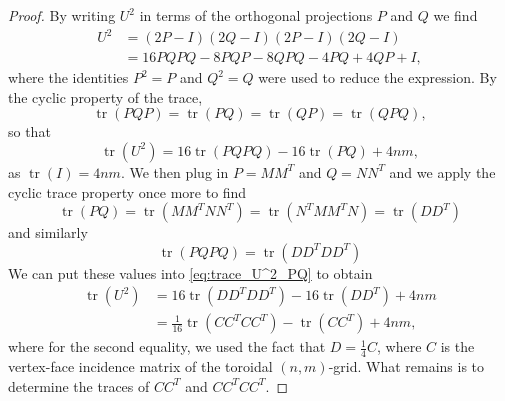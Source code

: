 \documentclass{article}
\numberwithin{equation}{section}
\DeclareMathOperator\tr{tr}
\begin{document}
\begin{proof}


By writing $U^2$ in terms of the orthogonal projections $P$ and $Q$ we find
\[
\begin{split}
U^2 &= (2P - I)(2Q - I)(2P - I)(2Q - I) \\
&= 16PQPQ - 8PQP - 8QPQ - 4PQ + 4QP + I,
\end{split}
\]
where the identities $P^2 = P$ and $Q^2 = Q$ were used to reduce the expression. By the cyclic property of the trace,
\[
\tr(PQP) = \tr(PQ) = \tr(QP) = \tr(QPQ),
\]
so that
\begin{equation}
\label{eq:trace_U^2_PQ}
\tr(U^2) = 16\tr(PQPQ) - 16\tr(PQ) + 4nm,
\end{equation}
as $\tr(I) = 4nm$. We then plug in $P = MM^T$ and $Q = NN^T$ and we apply the cyclic trace property once more to find
\[
\tr(PQ) = \tr(MM^TNN^T) = \tr(N^TMM^TN) = \tr(DD^T)
\]
and similarly
\[
\tr(PQPQ) = \tr(DD^TDD^T)
\]
We can put these values into \eqref{eq:trace_U^2_PQ} to obtain
\begin{align}
\nonumber \tr(U^2) &= 16\tr(DD^TDD^T) - 16\tr(DD^T) + 4nm \\
\label{eq:trace_U^2_CCT} &= \frac{1}{16}\tr(CC^TCC^T) - \tr(CC^T) + 4nm,
\end{align}
where for the second equality, we used the fact that $D = \frac{1}{4}C$, where $C$ is the vertex-face incidence matrix of the toroidal $(n,m)$-grid. What remains is to determine the traces of $CC^T$ and $CC^TCC^T$.


\end{proof}
\end{document}
